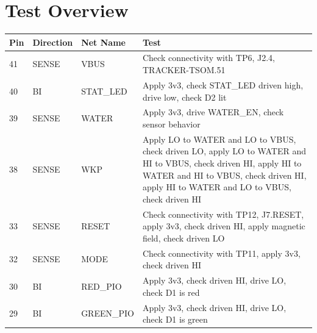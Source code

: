\documentclass{article}
\begin{document}
\section{Test Overview}
\begin{table}[ht]
    \centering
    \begin{tabular}{@{}lllp{}@{}}
        \toprule
        Pin   & Direction & Net Name             & Test                                                                                                                                                                \\ \midrule
        41    & SENSE     & VBUS                 & Check connectivity with TP6, J2.4, TRACKER-TSOM.51                                                                                                                  \\
        40    & BI        & STAT\_LED            & Apply 3v3, check STAT\_LED driven high, drive low, check D2 lit                                                                                                     \\
        39    & SENSE     & WATER                & Apply 3v3, drive WATER\_EN, check sensor behavior                                                                                                                   \\
        38    &
        SENSE &
        WKP   &
        Apply LO to WATER and LO to VBUS, check driven LO, apply LO to WATER and   HI to VBUS, check driven HI, apply HI to WATER and HI to VBUS, check driven   HI, apply HI to WATER and LO to VBUS, check driven HI \\
        33    &
        SENSE &
        RESET &
        Check connectivity with TP12, J7.RESET, apply 3v3, check   driven HI, apply magnetic field, check driven LO                                                                                                    \\
        32    & SENSE     & MODE                 & Check connectivity with TP11, apply 3v3, check driven HI                                                                                                            \\
        30    & BI        & RED\_PIO             & Apply 3v3, check driven HI, drive LO, check D1 is red                                                                                                               \\
        29    & BI        & GREEN\_PIO           & Apply 3v3, check driven HI, drive LO, check D1 is green                                                                                                             \\

\end{tabular}
\end{table}
\end{document}
